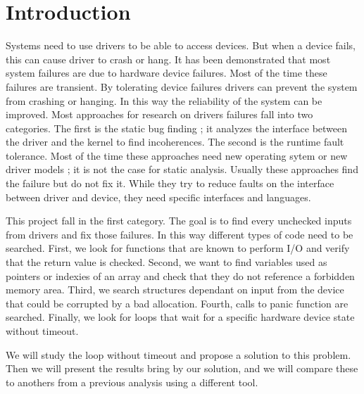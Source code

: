 \documentclass[a4paper,12pt]{article}
\begin{document}
\vfill


\tableofcontents
\vfill



\newpage\section{Introduction}

Systems need to use drivers to be able to access devices. But when a device fails, this can cause driver to crash or hang. It has been demonstrated that most system failures are due to hardware device failures. Most of the time these failures are transient. By tolerating device failures drivers can prevent the system from crashing or hanging. In this way the reliability of the system can be improved. Most approaches for research on drivers failures fall into two categories. The first is the static bug finding ; it analyzes the interface between the driver and the kernel to find incoherences. The second is the runtime fault tolerance. Most of the time these approaches need new operating sytem or new driver models ; it is not the case for static analysis. Usually these approaches find the failure but do not fix it. While they try to reduce faults on the interface between driver and device, they need specific interfaces and languages.

This project fall in the first category. The goal is to find every unchecked inputs from drivers and fix those failures. In this way different types of code need to be searched. First, we look for functions that are known to perform I/O and verify that the return value is checked. Second, we want to find variables used as pointers or indexies of an array and check that they do not reference a forbidden memory area. Third, we search structures dependant on input from the device that could be corrupted by a bad allocation. Fourth, calls to panic function are searched. Finally, we look for loops that wait for a specific hardware device state without timeout.

We will study the loop without timeout and propose a solution to this problem. Then we will present the results bring by our solution, and we will compare these to anothers from a previous analysis using a different tool.

\newpage
\end{document}
